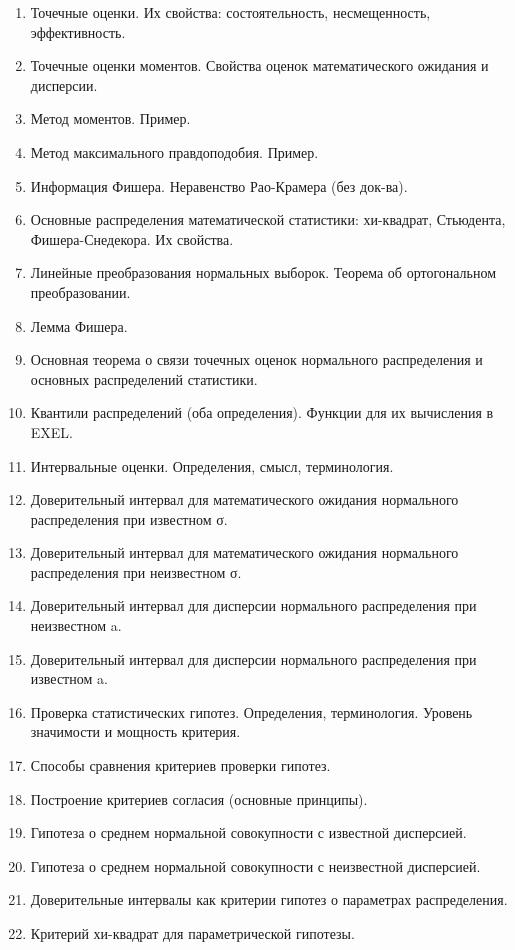 \documentclass[12pt]{article}
\begin{document}
\begin{enumerate}
    \item Точечные оценки. Их свойства: состоятельность, несмещенность, эффективность.
    \item Точечные оценки моментов. Свойства оценок математического ожидания и дисперсии.
    \item Метод моментов. Пример.
    \item Метод максимального правдоподобия. Пример.
    \item Информация Фишера. Неравенство Рао-Крамера (без док-ва).
    \item Основные распределения математической статистики: хи-квадрат, Стьюдента, Фишера-Снедекора. Их свойства.
    \item Линейные преобразования нормальных выборок. Теорема об ортогональном преобразовании.
    \item Лемма Фишера.
    \item Основная теорема о связи точечных оценок нормального распределения и основных распределений статистики.
    \item Квантили распределений (оба определения). Функции для их вычисления в EXEL.
    \item Интервальные оценки. Определения, смысл, терминология.
    \item Доверительный интервал для математического ожидания нормального распределения при известном σ.
    \item Доверительный интервал для математического ожидания нормального распределения при неизвестном σ.
    \item Доверительный интервал для дисперсии нормального распределения при неизвестном a.
    \item Доверительный интервал для дисперсии нормального распределения при известном a.
    \item Проверка статистических гипотез. Определения, терминология. Уровень значимости и мощность критерия.
    \item Способы сравнения критериев проверки гипотез.
    \item Построение критериев согласия (основные принципы).
    \item Гипотеза о среднем нормальной совокупности с известной дисперсией.
    \item Гипотеза о среднем нормальной совокупности с неизвестной дисперсией.
    \item Доверительные интервалы как критерии гипотез о параметрах распределения.
    \item Критерий хи-квадрат для параметрической гипотезы.

\end{enumerate}
\end{document}
